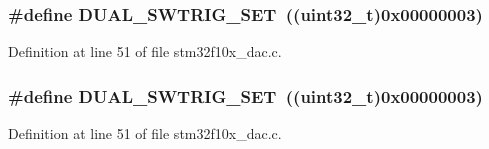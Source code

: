 \subsubsection[{\texorpdfstring{D\+U\+A\+L\+\_\+\+S\+W\+T\+R\+I\+G\+\_\+\+S\+ET}{DUAL_SWTRIG_SET}}]{\setlength{\rightskip}{0pt plus 5cm}\#define D\+U\+A\+L\+\_\+\+S\+W\+T\+R\+I\+G\+\_\+\+S\+ET~(({\bf uint32\+\_\+t})0x00000003)}\hypertarget{group___d_a_c___private___defines_ga6401668f65168b2b689b49155f380bdd}{}\label{group___d_a_c___private___defines_ga6401668f65168b2b689b49155f380bdd}


Definition at line 51 of file stm32f10x\+\_\+dac.\+c.

\subsubsection[{\texorpdfstring{D\+U\+A\+L\+\_\+\+S\+W\+T\+R\+I\+G\+\_\+\+S\+ET}{DUAL_SWTRIG_SET}}]{\setlength{\rightskip}{0pt plus 5cm}\#define D\+U\+A\+L\+\_\+\+S\+W\+T\+R\+I\+G\+\_\+\+S\+ET~(({\bf uint32\+\_\+t})0x00000003)}\hypertarget{group___d_a_c___private___defines_ga6401668f65168b2b689b49155f380bdd}{}\label{group___d_a_c___private___defines_ga6401668f65168b2b689b49155f380bdd}


Definition at line 51 of file stm32f10x\+\_\+dac.\+c.

